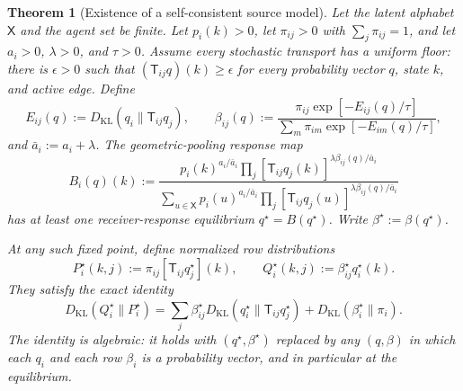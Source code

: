 \documentclass[11pt]{article}
\newtheorem{theorem}{Theorem}
\begin{document}
\begin{theorem}[Existence of a self-consistent source model]
\label{thm:self_consistent_source_equilibrium}
Let the latent alphabet $\mathsf{X}$ and the agent set be finite. Let $p_i(k)>0$, let $\pi_{ij}>0$ with $\sum_j\pi_{ij}=1$, and let $a_i>0$, $\lambda>0$, and $\tau>0$. Assume every stochastic transport has a uniform floor: there is $\epsilon>0$ such that $(\mathsf{T}_{ij}q)(k)\ge\epsilon$ for every probability vector $q$, state $k$, and active edge. Define
\begin{equation}
E_{ij}(q):=D_{\mathrm{KL}}(q_i\|\mathsf{T}_{ij}q_j),
\qquad
\beta_{ij}(q):=
\frac{\pi_{ij}\exp[-E_{ij}(q)/\tau]}
{\sum_m\pi_{im}\exp[-E_{im}(q)/\tau]},
\label{eq:self_consistent_attention}
\end{equation}
and $\bar{a}_i:=a_i+\lambda$. The geometric-pooling response map
\begin{equation}
B_i(q)(k):=
\frac{
p_i(k)^{a_i/\bar{a}_i}
\prod_j[\mathsf{T}_{ij}q_j(k)]^{\lambda\beta_{ij}(q)/\bar{a}_i}
}{
\sum_{u\in\mathsf{X}}
p_i(u)^{a_i/\bar{a}_i}
\prod_j[\mathsf{T}_{ij}q_j(u)]^{\lambda\beta_{ij}(q)/\bar{a}_i}
}
\label{eq:self_consistent_response_map}
\end{equation}
has at least one receiver-response equilibrium $q^\star=B(q^\star)$. Write $\beta^\star:=\beta(q^\star)$.

At any such fixed point, define normalized row distributions
\begin{equation}
P_i^\star(k,j):=\pi_{ij}[\mathsf{T}_{ij}q_j^\star](k),
\qquad
Q_i^\star(k,j):=\beta_{ij}^\star q_i^\star(k).
\label{eq:equilibrium_source_joint}
\end{equation}
They satisfy the exact identity
\begin{equation}
D_{\mathrm{KL}}(Q_i^\star\|P_i^\star)
=\sum_j\beta_{ij}^\star D_{\mathrm{KL}}(q_i^\star\|\mathsf{T}_{ij}q_j^\star)
+D_{\mathrm{KL}}(\beta_i^\star\|\pi_i).
\label{eq:equilibrium_row_kl_identity}
\end{equation}
The identity is algebraic: it holds with $(q^\star,\beta^\star)$ replaced by any $(q,\beta)$ in which each $q_i$ and each row $\beta_i$ is a probability vector, and in particular at the equilibrium.
\end{theorem}
\end{document}
